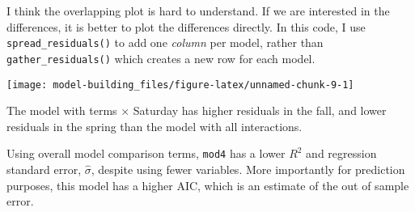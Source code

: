 \documentclass[]{book}
\newenvironment{Shaded}{\begin{snugshade}}{\end{snugshade}}
\newcommand{\CommentTok}[1]{\textcolor[rgb]{0.56,0.35,0.01}{\textit{#1}}}
\newcommand{\DataTypeTok}[1]{\textcolor[rgb]{0.13,0.29,0.53}{#1}}
\newcommand{\FloatTok}[1]{\textcolor[rgb]{0.00,0.00,0.81}{#1}}
\newcommand{\KeywordTok}[1]{\textcolor[rgb]{0.13,0.29,0.53}{\textbf{#1}}}
\newcommand{\NormalTok}[1]{#1}
\newcommand{\OperatorTok}[1]{\textcolor[rgb]{0.81,0.36,0.00}{\textbf{#1}}}
\newcommand{\StringTok}[1]{\textcolor[rgb]{0.31,0.60,0.02}{#1}}
\theoremstyle{plain}
\theoremstyle{remark}
\begin{document}
I think the overlapping plot is hard to understand. If we are interested
in the differences, it is better to plot the differences directly. In
this code, I use \texttt{spread\_residuals()} to add one \emph{column}
per model, rather than \texttt{gather\_residuals()} which creates a new
row for each model.

\begin{Shaded}
\end{Shaded}

\begin{center}\texttt{[image: model-building\_files/figure-latex/unnamed-chunk-9-1]} \end{center}

The model with terms × Saturday has higher residuals in the fall, and
lower residuals in the spring than the model with all interactions.

Using overall model comparison terms, \texttt{mod4} has a lower \(R^2\)
and regression standard error, \(\hat{\sigma}\), despite using fewer
variables. More importantly for prediction purposes, this model has a
higher AIC, which is an estimate of the out of sample error.

\begin{Shaded}
\end{Shaded}

\begin{Shaded}
\end{Shaded}
\end{document}

